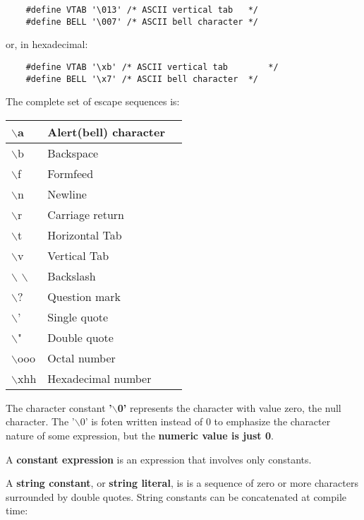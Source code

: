 \documentclass{article}
\begin{document}
\begin{lstlisting}
	#define VTAB '\013' /* ASCII vertical tab 	*/
	#define BELL '\007' /* ASCII bell character	*/
\end{lstlisting}

or, in hexadecimal:

\begin{lstlisting}
	#define VTAB '\xb' /* ASCII vertical tab 		*/
	#define BELL '\x7' /* ASCII bell character	*/
\end{lstlisting}

The complete set of escape sequences is:

\begin{tabularx}{0.8\textwidth}{ 
  | >{\raggedright\arraybackslash}X 
  | >{\centering\arraybackslash}X 
  | >{\raggedleft\arraybackslash}X | }
  \hline
  $\backslash$a & Alert(bell) character \\
  \hline
  $\backslash$b & Backspace \\
  \hline
  $\backslash$f & Formfeed \\
  \hline
  $\backslash$n & Newline \\
  \hline
  $\backslash$r & Carriage return \\
  \hline
  $\backslash$t & Horizontal Tab\\
  \hline
  $\backslash$v & Vertical Tab \\
  \hline
  $\backslash$ $\backslash$ & Backslash \\
  \hline
  $\backslash$? & Question mark \\
  \hline
  $\backslash$' & Single quote \\
  \hline
  $\backslash$" & Double quote \\
  \hline
  $\backslash$ooo & Octal number \\
  \hline
  $\backslash$xhh & Hexadecimal number \\
  \hline
  
 \end{tabularx}

\vspace{8pt}
The character constant \textbf{'$\backslash$0'} represents the character with value zero, the null character. The '$\backslash$0' is foten written instead of 0 to emphasize the character nature of some expression, but the \textbf{numeric value is just 0}.

A \textbf{constant expression} is an expression that involves only constants.

\clearpage
A \textbf{string constant}, or \textbf{string literal}, is is a sequence of zero or more characters surrounded by double quotes.
String constants can be concatenated at compile time: 
\end{document}
